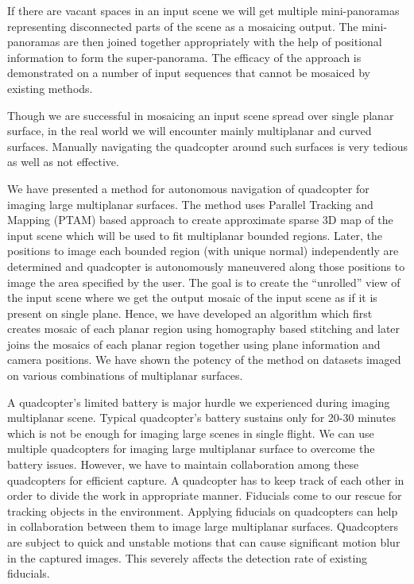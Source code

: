 If there are vacant spaces in an input scene we will get multiple mini-panoramas
representing disconnected parts of the scene as a mosaicing output.
The mini-panoramas are then joined together appropriately with the help of
positional information to form the super-panorama. The efficacy of the approach
is demonstrated on a number of input sequences that cannot be mosaiced by existing methods.

Though we are successful in mosaicing an input scene spread over single planar
surface, in the real world we will encounter mainly multiplanar and curved
surfaces. Manually navigating the quadcopter around such surfaces is very
tedious as well as not effective. 

We have presented a method for autonomous navigation of quadcopter for imaging
large multiplanar surfaces. The method uses Parallel Tracking and Mapping
(PTAM) based approach to create approximate sparse 3D map of the input scene
which will be used to fit multiplanar bounded regions. Later, the positions to
image each bounded region (with unique normal) independently are determined and
quadcopter is autonomously maneuvered along those positions to image the area
specified by the user. The goal is to create the “unrolled” view of the input
scene where we get the output mosaic of the input scene as if it is present on
single plane. Hence, we have developed an algorithm which first creates mosaic
of each planar region using homography based stitching and later joins the
mosaics of each planar region together using plane information and camera
positions. We have shown the potency of the method on datasets imaged on various
combinations of multiplanar surfaces.

A quadcopter's limited battery is major hurdle we experienced during imaging
multiplanar scene. Typical quadcopter's battery sustains only for 20-30 minutes
which is not be enough for imaging large scenes in single flight. We can use
multiple quadcopters for imaging large multiplanar surface to overcome the
battery issues. However, we have to maintain collaboration among these
quadcopters for efficient capture. A quadcopter has to keep track of each other
in order to divide the work in appropriate manner. Fiducials come to our rescue
for tracking objects in the environment. Applying fiducials on quadcopters can
help in collaboration between them to image large multiplanar surfaces.
Quadcopters are subject to quick and unstable motions that can cause
significant motion blur in the captured images. This severely affects the
detection rate of existing fiducials. 


